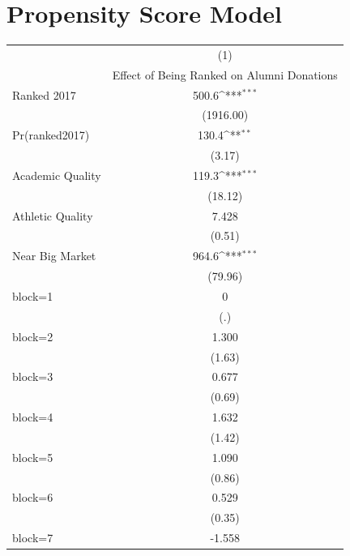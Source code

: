 \documentclass{article}
\begin{document}
\section{Propensity Score Model}
{
\def\sym#1{\ifmmode^{#1}\else\(^{#1}\)\fi}
\begin{longtable}{l*{1}{c}}
\hline\hline\endfirsthead\hline\endhead\hline\endfoot\endlastfoot
                    &\multicolumn{1}{c}{(1)}\\
                    &\multicolumn{1}{c}{Effect of Being Ranked on Alumni Donations}\\
\hline
Ranked 2017         &       500.6\sym{***}\\
                    &   (1916.00)         \\
[1em]
Pr(ranked2017)      &       130.4\sym{**} \\
                    &      (3.17)         \\
[1em]
Academic Quality    &       119.3\sym{***}\\
                    &     (18.12)         \\
[1em]
Athletic Quality    &       7.428         \\
                    &      (0.51)         \\
[1em]
Near Big Market     &       964.6\sym{***}\\
                    &     (79.96)         \\
[1em]
block=1             &           0         \\
                    &         (.)         \\
[1em]
block=2             &       1.300         \\
                    &      (1.63)         \\
[1em]
block=3             &       0.677         \\
                    &      (0.69)         \\
[1em]
block=4             &       1.632         \\
                    &      (1.42)         \\
[1em]
block=5             &       1.090         \\
                    &      (0.86)         \\
[1em]
block=6             &       0.529         \\
                    &      (0.35)         \\
[1em]
block=7             &      -1.558         \\

\end{longtable}}
\end{document}
